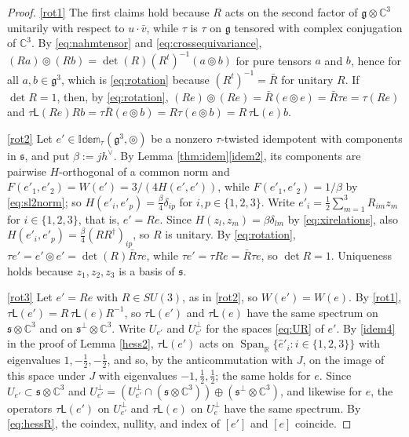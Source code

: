 \documentclass [leqno, 10pt]{amsart}
\theoremstyle{definition}
\numberwithin{equation}{section}
\newcommand{\idem}{\mathbb{Idem}}
\newcommand{\tmlt}{\circledcirc}
\newcommand{\lin}{\mathsf{L}}
\newcommand{\spn}{\operatorname{Span}}
\newcommand{\g}{\mathfrak{g}}
\newcommand{\rea}{\mathbb R}
\newcommand{\com}{\mathbb C}
\newcommand{\hv}{h^\vee}
\newcommand{\subs}{\mathfrak{s}}
\newcommand{\Usp}{U}
\newcommand{\Uperp}{\Usp^{\perp}}
\begin{document}
\begin{proof}
\ref{rot1} The first claims hold because $R$ acts on the second factor of $\g \otimes \com^{3}$ unitarily with respect to $u \cdot \bar{v}$, while $\tau$ is $\tau$ on $\g$ tensored with complex conjugation of $\com^{3}$. By \eqref{eq:nahmtensor} and \eqref{eq:crossequivariance}, $(Ra) \tmlt (Rb) = \det(R)(R^{t})^{-1}(a \tmlt b)$ for pure tensors $a$ and $b$, hence for all $a, b \in \g^{3}$, which is \eqref{eq:rotation} because $(R^{t})^{-1} = \bar{R}$ for unitary $R$. If $\det R = 1$, then, by \eqref{eq:rotation}, $(Re) \tmlt (Re) = \bar{R}(e \tmlt e) = \bar{R}\tau e = \tau(Re)$ and $\tau\lin(Re)Rb = \tau\bar{R}(e \tmlt b) = R\tau(e \tmlt b) = R\,\tau\lin(e)b$.

\ref{rot2} Let $e' \in\idem_{\tau}(\g^{3}, \tmlt)$ be a nonzero $\tau$-twisted idempotent with components in $\subs$, and put $\beta := j\hv$. By Lemma \ref{thm:idem}\ref{idem2}, its components are pairwise $H$-orthogonal of a common norm and $F(e'_{1}, e'_{2}) = W(e') = 3/(4H(e', e'))$, while $F(e'_{1}, e'_{2}) = 1/\beta$ by \eqref{eq:sl2norm}; so $H(e'_{i}, e'_{p}) = \tfrac{\beta}{4}\delta_{ip}$ for $i, p \in \{1, 2, 3\}$. Write $e'_{i} = \tfrac{1}{2}\sum_{m=1}^{3}R_{im}z_{m}$ for $i \in \{1, 2, 3\}$, that is, $e' = Re$. Since $H(z_{l}, z_{m}) = \beta\delta_{lm}$ by \eqref{eq:xirelations}, also $H(e'_{i}, e'_{p}) = \tfrac{\beta}{4}(RR^{\dagger})_{ip}$, so $R$ is unitary. By \eqref{eq:rotation}, $\tau e' = e' \tmlt e' = \det(R)\bar{R}\tau e$, while $\tau e' = \tau Re = \bar{R}\tau e$, so $\det R = 1$. Uniqueness holds because $z_{1}, z_{2}, z_{3}$ is a basis of $\subs$.

\ref{rot3} Let $e' = Re$ with $R \in SU(3)$, as in \ref{rot2}, so $W(e') = W(e)$. By \ref{rot1}, $\tau\lin(e') = R\,\tau\lin(e)R^{-1}$, so $\tau\lin(e')$ and $\tau\lin(e)$ have the same spectrum on $\subs\otimes\com^{3}$ and on $\subs^{\perp}\otimes\com^{3}$. Write $\Usp_{e'}$ and $\Uperp_{e'}$ for the spaces \eqref{eq:UR} of $e'$. By \eqref{idem4} in the proof of Lemma \ref{hess2}, $\tau\lin(e')$ acts on $\spn_{\rea}\{\hat{e}'_{i}: i \in \{1, 2, 3\}\}$ with eigenvalues $1, -\tfrac{1}{2}, -\tfrac{1}{2}$, and so, by the anticommutation with $J$, on the image of this space under $J$ with eigenvalues $-1, \tfrac{1}{2}, \tfrac{1}{2}$; the same holds for $e$. Since $\Usp_{e'} \subset \subs \otimes \com^{3}$ and $\Uperp_{e'} = (\Uperp_{e'} \cap (\subs\otimes\com^{3})) \oplus (\subs^{\perp}\otimes\com^{3})$, and likewise for $e$, the operators $\tau\lin(e')$ on $\Uperp_{e'}$ and $\tau\lin(e)$ on $\Uperp_{e}$ have the same spectrum. By \eqref{eq:hessR}, the coindex, nullity, and index of $[e']$ and $[e]$ coincide.
\end{proof}
\end{document}
